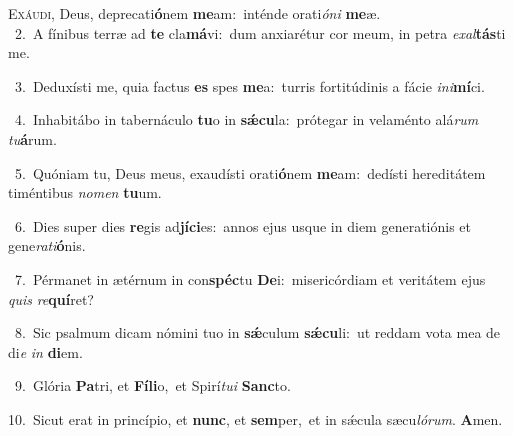 \lettrine{\initial\textcolor{\initialcolor}{E}}{xáudi,} Deus, deprecati\-\textbf{ó}\-nem \textbf{me}\-am:~\star inténde orati\-\textit{ó}\-\textit{ni} \textbf{me}\-æ.\\
{\numbfont\textcolor{\numbcolor}{~2.}}~A fínibus terræ ad \textbf{te} cla\-\textbf{má}\-vi:~\star dum anxiarétur cor meum, in petra \textit{ex}\-\textit{al}\textbf{tás}ti me.\par
{\numbfont\textcolor{\numbcolor}{~3.}}~Deduxísti me, quia factus \textbf{es} spes \textbf{me}\-a:~\star turris fortitúdinis a fácie \textit{in}\-\textit{i}\textbf{mí}ci.\par
{\numbfont\textcolor{\numbcolor}{~4.}}~Inhabitábo in tabernáculo \textbf{tu}\-o in \textbf{sǽ}\-\textbf{cu}la:~\star prótegar in velaménto alá\textit{rum} \textit{tu}\-\textbf{á}rum.\par
{\numbfont\textcolor{\numbcolor}{~5.}}~Quóniam tu, Deus meus, exaudísti orati\-\textbf{ó}\-nem \textbf{me}\-am:~\star dedísti hereditátem timéntibus \textit{no}\-\textit{men} \textbf{tu}\-um.\par
{\numbfont\textcolor{\numbcolor}{~6.}}~Dies super dies \textbf{re}\-gis ad\-\textbf{jí}\-\textbf{ci}es:~\star annos ejus usque in diem generatiónis et gene\-\textit{ra}\-\textit{ti}\textbf{ó}nis.\par
{\numbfont\textcolor{\numbcolor}{~7.}}~Pérmanet in ætérnum in con\-\textbf{spéc}\-tu \textbf{De}\-i:~\star misericórdiam et veritátem ejus \textit{quis} \textit{re}\-\textbf{quí}ret?\par
{\numbfont\textcolor{\numbcolor}{~8.}}~Sic psalmum dicam nómini tuo in \textbf{sǽ}\-culum \textbf{sǽ}\-\textbf{cu}li:~\star ut reddam vota mea de di\textit{e} \textit{in} \textbf{di}\-em.\par
{\numbfont\textcolor{\numbcolor}{~9.}}~Glória \textbf{Pa}\-tri, et \textbf{Fí}\-\textbf{li}o,~\star et Spirí\-\textit{tu}\-\textit{i} \textbf{Sanc}\-to.\par
{\numbfont\textcolor{\numbcolor}{10.}}~Sicut erat in princípio, et \textbf{nunc}\-, et \textbf{sem}\-per,~\star et in sǽcula sæcu\-\textit{ló}\-\textit{rum}. \textbf{A}\-men.\par
